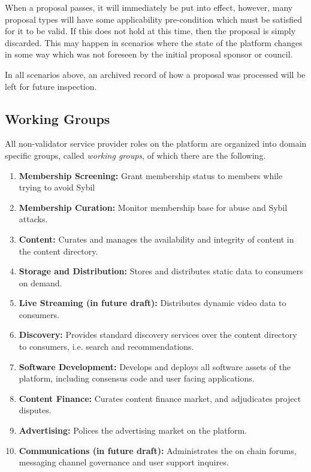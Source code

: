 \documentclass{article}
\begin{document}
When a proposal passes, it will immediately be put into effect, however, many proposal types will have some applicability pre-condition which must be satisfied for it to be valid. If this does not hold at this time, then the proposal is simply discarded. This may happen in scenarios where the state of the platform changes in some way which was not foreseen by the initial proposal sponsor or council.

In all scenarios above, an archived record of how a proposal was processed will be left for future inspection.


\subsection{Working Groups} \label{sec:working_groups}

All non-validator service provider roles on the platform are organized into domain specific groups, called \textit{working groups}, of which there are the following.

\begin{enumerate}
  \item \textbf{Membership Screening:} Grant membership status to members while trying to avoid Sybil
  \item \textbf{Membership Curation:} Monitor membership base for abuse and Sybil attacks.
  \item \textbf{Content:} Curates and manages the availability and integrity of content in the content directory.
  \item \textbf{Storage and Distribution:} Stores and distributes static data to consumers on demand.
  \item \textbf{Live Streaming (in future draft):} Distributes dynamic video data to consumers.
  \item \textbf{Discovery:} Provides standard discovery services over the content directory to consumers, i.e. search and recommendations.
  \item \textbf{Software Development:} Develops and deploys all software assets of the platform, including consensus code and user facing applications.
  \item \textbf{Content Finance:} Curates content finance market, and adjudicates project disputes.
  \item \textbf{Advertising:} Polices the advertising market on the platform.
  \item \textbf{Communications (in future draft):} Administrates the on chain forums, messaging channel governance and user support inquires.
\end{enumerate}
\end{document}
